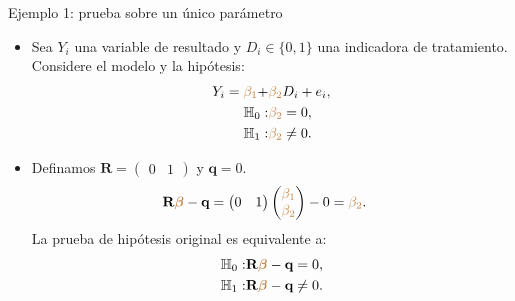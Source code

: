 \documentclass[10pt, xcolor=dvipsnames]{beamer}
\begin{document}
\begin{frame}{Ejemplo 1: prueba sobre un único parámetro}
\begin{itemize}
    \item Sea \(Y_i\) una variable de resultado y \(D_i \in \{0, 1\}\) una indicadora de tratamiento. Considere el modelo y la hipótesis:
    \vspace{0.0em}
    \begin{align*}
    \begin{split}
        Y_i = \textcolor{brown}{\beta_1} + &\textcolor{brown}{\beta_2} D_{i} + e_i, \\
        \textcolor{black}{\mathbb{H}_{0}}:& \textcolor{brown}{\beta_2} = 0, \\
        \textcolor{black}{\mathbb{H}_{1}}:& \textcolor{brown}{\beta_2} \neq 0.
    \end{split}
    \end{align*}
    \vspace{-1em}
    	\item Definamos $\textbf{R} = \begin{pmatrix} 0 & 1 \end{pmatrix}$ y $\textbf{q}=0$. \vspace{-0.2cm}
    \begin{align*}
    \begin{split}
        \textbf{R}\textcolor{brown}{\boldsymbol{\beta}} - \textbf{q} &= \begin{pmatrix} 0 & 1 \end{pmatrix} \begin{pmatrix} \textcolor{brown}{\beta_1} \\ \textcolor{brown}{\beta_2}\end{pmatrix} -0 = \textcolor{brown}{\beta_2}.
    \end{split}
    \end{align*}
    La prueba de hipótesis original es equivalente a:
    \begin{align*}
    \begin{split}
    \textcolor{black}{\mathbb{H}_{0}}:& \textbf{R}\textcolor{brown}{\boldsymbol{\beta}} - \textbf{q} = 0, \\
    \textcolor{black}{\mathbb{H}_{1}}:& \textbf{R}\textcolor{brown}{\boldsymbol{\beta}} - \textbf{q} \neq 0.
    \end{split}
    \end{align*}
\end{itemize}
\end{frame}
\end{document}
